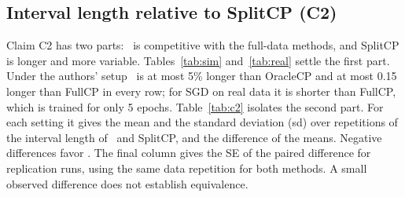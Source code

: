 \subsection{Interval length relative to SplitCP (C2)}
\label{sec:c2}

Claim C2 has two parts: \LOO\ is competitive with the full-data methods, and SplitCP is longer and more variable.
Tables~\ref{tab:sim} and~\ref{tab:real} settle the first part. Under the authors' setup \LOO\ is at most 5\% longer
than OracleCP and at most 0.15 longer than FullCP in every row; for SGD on real data it is shorter than FullCP, which
is trained for only 5 epochs. Table~\ref{tab:c2} isolates the second part. For each setting it gives the mean and the
standard deviation (sd) over repetitions of the interval length of \LOO\ and SplitCP, and the difference of the means.
Negative differences favor \LOO. The final column gives the SE of the paired difference for replication runs, using the same data repetition for both methods. A small observed difference does not establish equivalence.

